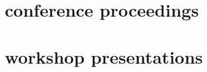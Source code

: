\documentclass[10pt,oneside]{article}
\begin{document}
\section{conference proceedings}

\mbox{}\vspace{-\dimexpr\baselineskip\relax}
\vspace*{-1em}
\printbibliography[type=inproceedings, heading=none]


\section{workshop presentations}

\mbox{}\vspace{-\dimexpr\baselineskip\relax}
\end{document}
